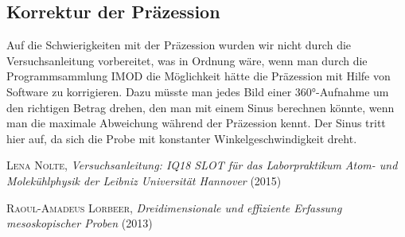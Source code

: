 \subsection{Korrektur der Präzession}
Auf die Schwierigkeiten mit der Präzession wurden wir nicht durch die Versuchsanleitung \cite{Anleitung} vorbereitet, was in Ordnung wäre, wenn man durch die Programmsammlung IMOD die Möglichkeit hätte die Präzession mit Hilfe von Software zu korrigieren.
Dazu müsste man jedes Bild einer 360°-Aufnahme um den richtigen Betrag drehen, den man mit einem Sinus berechnen könnte, wenn man die maximale Abweichung während der Präzession kennt.
Der Sinus tritt hier auf, da sich die Probe mit konstanter Winkelgeschwindigkeit dreht.

\clearpage
\listoffigures
\begin{thebibliography}{99}
 \textsc{Lena Nolte}, \emph{Versuchsanleitung: IQ18 SLOT für das Laborpraktikum Atom- und Molekühlphysik
der Leibniz Universität Hannover} (2015) 

 \textsc{Raoul-Amadeus Lorbeer}, \emph{Dreidimensionale und effiziente Erfassung mesoskopischer Proben} (2013) 
\end{thebibliography}




